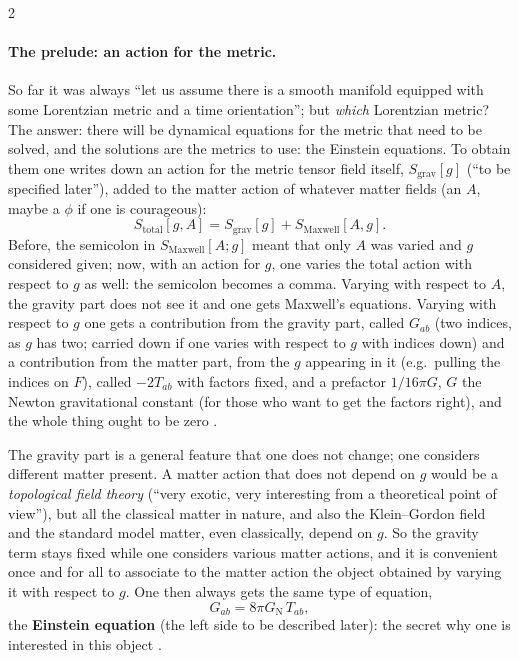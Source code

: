 \begin{paracol}{2}
\paragraph{The prelude: an action for the metric.} So far it was always ``let us assume there is a smooth manifold equipped with some Lorentzian metric and a time orientation''; but \emph{which} Lorentzian metric? The answer: there will be dynamical equations for the metric that need to be solved, and the solutions are the metrics to use: the Einstein equations. To obtain them one writes down an action for the metric tensor field itself, $S_{\mathrm{grav}}[g]$ (``to be specified later''), added to the matter action of whatever matter fields (an $A$, maybe a $\phi$ if one is courageous):
\[
  S_{\mathrm{total}}[g,A]=S_{\mathrm{grav}}[g]+S_{\mathrm{Maxwell}}[A,g].
\]
Before, the semicolon in $S_{\mathrm{Maxwell}}[A;g]$ meant that only $A$ was varied and $g$ considered given; now, with an action for $g$, one varies the total action with respect to $g$ as well: the semicolon becomes a comma. Varying with respect to $A$, the gravity part does not see it and one gets Maxwell's equations. Varying with respect to $g$ one gets a contribution from the gravity part, called $G_{ab}$ (two indices, as $g$ has two; carried down if one varies with respect to $g$ with indices down) and a contribution from the matter part, from the $g$ appearing in it (e.g.\ pulling the indices on $F$), called $-2T_{ab}$ with factors fixed, and a prefactor $1/16\pi G$, $G$ the Newton gravitational constant (for those who want to get the factors right), and the whole thing ought to be zero .

The gravity part is a general feature that one does not change; one considers different matter present. A matter action that does not depend on $g$ would be a \emph{topological field theory} (``very exotic, very interesting from a theoretical point of view''), but all the classical matter in nature, and also the Klein--Gordon field and the standard model matter, even classically, depend on $g$. So the gravity term stays fixed while one considers various matter actions, and it is convenient once and for all to associate to the matter action the object obtained by varying it with respect to $g$. One then always gets the same type of equation,
\[
  G_{ab}=8\pi G_{\mathrm N}\,T_{ab},
\]
the \textbf{Einstein equation} (the left side to be described later): the secret why one is interested in this object .


\end{paracol}
